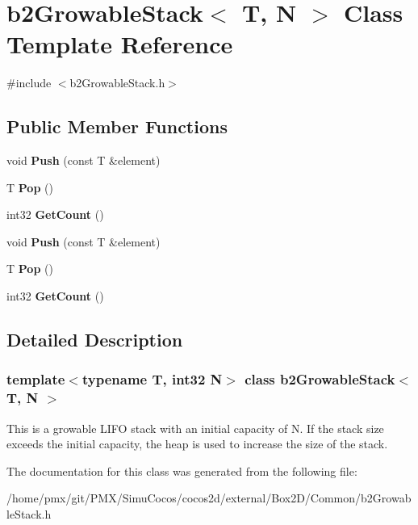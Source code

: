\hypertarget{classb2GrowableStack}{}\section{b2\+Growable\+Stack$<$ T, N $>$ Class Template Reference}
\label{classb2GrowableStack}


{\ttfamily \#include $<$b2\+Growable\+Stack.\+h$>$}

\subsection*{Public Member Functions}
\begin{DoxyCompactItemize}
\item 
\mbox{\label{classb2GrowableStack_a23661327d64ff72d1ec8d6bcdb6d8992}} 
void {\bfseries Push} (const T \&element)
\item 
\mbox{\label{classb2GrowableStack_a53e53dcd6bff8308405a881f02957bc8}} 
T {\bfseries Pop} ()
\item 
\mbox{\label{classb2GrowableStack_a3049e76ba7182b988450bfe94d30d5aa}} 
int32 {\bfseries Get\+Count} ()
\item 
\mbox{\label{classb2GrowableStack_a23661327d64ff72d1ec8d6bcdb6d8992}} 
void {\bfseries Push} (const T \&element)
\item 
\mbox{\label{classb2GrowableStack_a53e53dcd6bff8308405a881f02957bc8}} 
T {\bfseries Pop} ()
\item 
\mbox{\label{classb2GrowableStack_a3049e76ba7182b988450bfe94d30d5aa}} 
int32 {\bfseries Get\+Count} ()
\end{DoxyCompactItemize}


\subsection{Detailed Description}
\subsubsection*{template$<$typename T, int32 N$>$\newline
class b2\+Growable\+Stack$<$ T, N $>$}

This is a growable L\+I\+FO stack with an initial capacity of N. If the stack size exceeds the initial capacity, the heap is used to increase the size of the stack. 

The documentation for this class was generated from the following file\+:\begin{DoxyCompactItemize}
\item 
/home/pmx/git/\+P\+M\+X/\+Simu\+Cocos/cocos2d/external/\+Box2\+D/\+Common/b2\+Growable\+Stack.\+h\end{DoxyCompactItemize}
